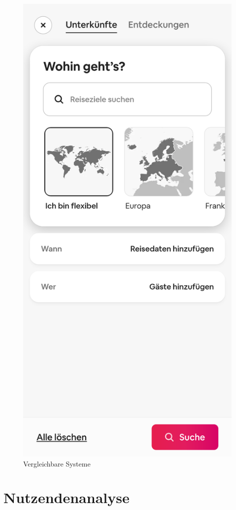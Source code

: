 \begin{figure}[h]
        \includegraphics[scale=0.1]{Bilder/Arbnbnsuche.png}
        \caption[Vergleichbare Systeme]{Vergleichbare Systeme}\label{fig:system}
\end{figure}
\section{Nutzendenanalyse}


